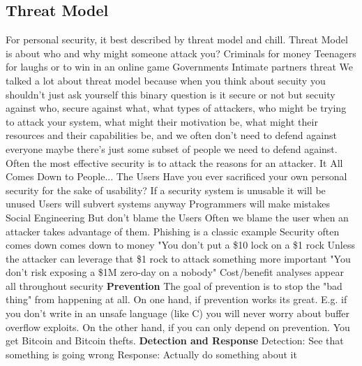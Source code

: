 \documentclass[11 pt]{scrartcl}
\begin{document}
\subsection{Threat Model}
For personal security, it best described by threat model and chill.\newline
Threat Model is about who and why might someone attack you? 
\itemnum
    \ii Criminals for money
    \ii Teenagers for laughs or to win in an online game
    \ii Governments
    \ii Intimate partners threat
\itemend
We talked a lot about threat model because when you think about secuity you shouldn't just ask yourself this binary question is it secure or not but secuity  against who, secure against what, what types of attackers, who might be
trying to attack your system, what might their motivation be, what might their
resources and their capabilities be, and we often don't need to defend against everyone maybe there's just some subset of people we need to defend against.
Often the most effective security is to attack the reasons for an attacker.\newline
It All Comes Down to People... \newline
The Users\newline
Have you ever sacrificed your own personal security for the sake of usability?
\itemnum
    \ii If a security system is unusable it will be unused
    \ii Users will subvert systems anyway
    \ii Programmers will make mistakes
    \ii Social Engineering
\itemend
But don't blame the Users
\itemnum
    \ii Often we blame the user when an attacker takes advantage of them.
    \ii Phishing is a classic example
\itemend
Security often comes down comes down to money 
\itemnum
    \ii "You don't put a \$10 lock on a \$1 rock Unless the attacker can leverage that \$1 rock to attack something more important
    \ii "You don't risk exposing a \$1M zero-day on a nobody"
    \ii Cost/benefit analyses appear all throughout security
\itemend
\textbf{Prevention}\newline
The goal of prevention is to stop the "bad thing" from happening at all. On one hand, if prevention works its great. E.g. if you don't write in an unsafe language (like C) you will never worry about buffer overflow exploits. On the other hand, if you can only depend on prevention. You get Bitcoin and Bitcoin thefts.\newline
\textbf{Detection and Response}\newline
Detection: See that something is going wrong\newline
Response: Actually do something about it\newline
\end{document}
